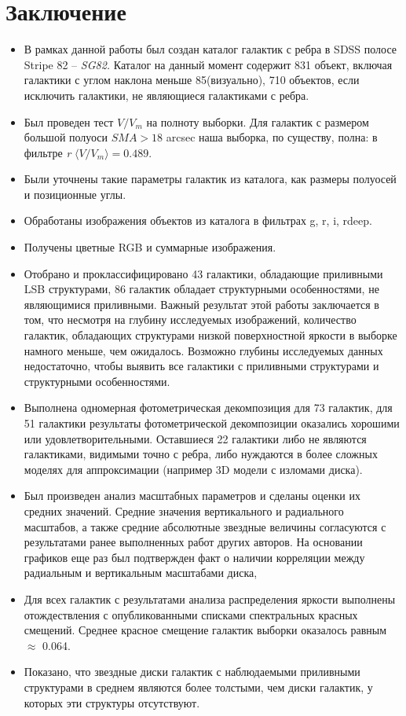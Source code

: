 \section{Заключение}
\begin{itemize}
    \item В рамках данной работы был создан каталог галактик с ребра в SDSS полосе Stripe 82 -- \textit{SG82.} Каталог на данный момент содержит 831 объект, включая галактики с углом наклона меньше 85\degree (визуально), 710 объектов, если исключить галактики, не являющиеся галактиками с ребра.
    \item Был проведен тест $V/V_m$ на полноту выборки. Для галактик с размером большой полуоси $SMA>18$ arcsec наша выборка, по существу, полна: в фильтре \textit{r} $\langle V/V_m \rangle = 0.489$.
    \item Были уточнены такие параметры галактик из каталога, как размеры полуосей и позиционные углы.
    \item Обработаны изображения объектов из каталога в фильтрах g, r, i, rdeep. 
    \item Получены цветные RGB и суммарные изображения.
    \item Отобрано и проклассифицировано 43 галактики, обладающие приливными LSB структурами, 86 галактик обладает структурными особенностями, не являющимися приливными. Важный результат этой работы заключается в том, что несмотря на глубину исследуемых изображений, количество галактик, обладающих структурами низкой поверхностной яркости в выборке намного меньше, чем ожидалось. Возможно глубины исследуемых данных недостаточно, чтобы выявить все галактики с приливными структурами и структурными особенностями.
    \item Выполнена одномерная фотометрическая декомпозиция для 73 галактик, для 51 галактики результаты фотометрической декомпозиции оказались хорошими или удовлетворительными. Оставшиеся 22 галактики либо не являются галактиками, видимыми точно с ребра, либо нуждаются в более сложных моделях для аппроксимации (например 3D модели с изломами диска). 
    \item Был произведен анализ масштабных параметров и сделаны оценки их средних значений. Средние значения вертикального и радиального масштабов, а также средние абсолютные звездные величины согласуются с результатами ранее выполненных работ других авторов. На основании графиков еще раз был подтвержден факт о наличии корреляции между радиальным и вертикальным масштабами диска, 
    \item Для всех галактик с результатами анализа распределения яркости выполнены отождествления с опубликованными списками спектральных красных смещений. Среднее красное смещение галактик выборки оказалось равным $\approx$ 0.064.
    \item Показано, что звездные диски галактик с наблюдаемыми приливными структурами в среднем являются более толстыми, чем диски галактик, у которых эти структуры отсутствуют.

\end{itemize}

